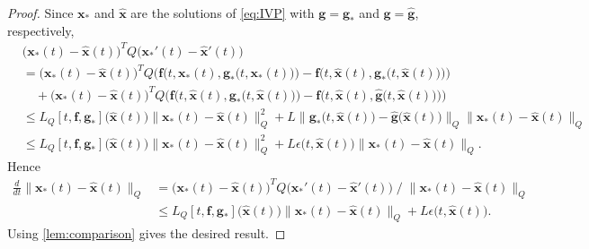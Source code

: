 \documentclass[onefignum,onetabnum]{siamart220329}
\numberwithin{equation}{section}
\newcommand{\bff}{\ensuremath{\mathbf{f}}} %
\newcommand{\bg}{\ensuremath{\mathbf{g}}} %
\newcommand{\bx}{\ensuremath{\mathbf{x}}} %
\begin{document}
\begin{proof}
    Since $\bx_*$ and $\widehat{\bx}$ are the solutions of \cref{eq:IVP} with $\bg = \bg_*$ and $\bg = \widehat{\bg}$,
    respectively,
    \begin{align*}
       & \Big( \bx_*(t) - \widehat{\bx}(t) \Big)^T Q  \Big(  \bx_*'(t) - \widehat{\bx}'(t) \Big)  \\
         &=  \Big( \bx_*(t) - \widehat{\bx}(t) \Big)^T Q
               \Bigg( \bff\Big( t, \bx_*(t), \bg_*\big( t, \bx_*(t) \big) \Big) -  \bff\Big( t, \widehat{\bx}(t), \bg_*\big( t, \widehat{\bx}(t) \big) \Big) \Bigg)  \\
            & \quad  + \Big( \bx_*(t) - \widehat{\bx}(t) \Big)^T Q
                   \Bigg( \bff\Big( t, \widehat{\bx}(t), \bg_*\big( t, \widehat{\bx}(t) \big) \Big) -  \bff\Big( t, \widehat{\bx}(t), \widehat{\bg}\big(t, \widehat{\bx}(t) \big) \Big) \Bigg) \\
       &\le  L_Q[t, \bff,\bg_*]\big(  \widehat{\bx}(t) \big)  \big\| \bx_*(t) - \widehat{\bx}(t) \big\|_Q^2 
                 + L   \Big\| \bg_*\big( t, \widehat{\bx}(t) \big)  -  \widehat{\bg}\big(\widehat{\bx}(t) \big) \Big\|_Q \big\| \bx_*(t) - \widehat{\bx}(t) \big\|_Q \\
      &\le  L_Q[t, \bff,\bg_*]\big(  \widehat{\bx}(t) \big)  \big\| \bx_*(t) - \widehat{\bx}(t) \big\|_Q^2 
                 + L    \epsilon\big( t, \widehat{\bx}(t) \big)  \big\| \bx_*(t) - \widehat{\bx}(t) \big\|_Q.
    \end{align*}
    Hence
    \begin{align*}           
         \frac{d}{dt}  \big\| \bx_*(t) - \widehat{\bx}(t) \big\|_Q
        &= \Big( \bx_*(t) - \widehat{\bx}(t) \Big)^T Q  \Big(  \bx_*'(t) - \widehat{\bx}'(t) \Big)   \; \big/ \; \big\| \bx_*(t) - \widehat{\bx}(t) \big\|_Q \\
        &\le L_Q[t,\bff,\bg_*]\big(  \widehat{\bx}(t) \big)  \big\| \bx_*(t) - \widehat{\bx}(t) \big\|_Q
                 + L    \epsilon\big( t, \widehat{\bx}(t) \big). 
    \end{align*}
    Using \cref{lem:comparison} gives the desired result. 
 \end{proof}
\end{document}
